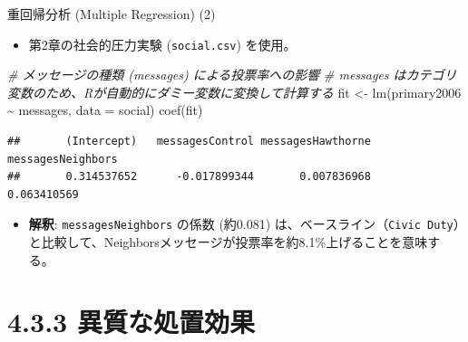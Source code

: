\documentclass[
  ignorenonframetext,
]{beamer}
\newenvironment{Shaded}{\begin{snugshade}}{\end{snugshade}}
\newcommand{\AttributeTok}[1]{\textcolor[rgb]{0.77,0.63,0.00}{#1}}
\newcommand{\CommentTok}[1]{\textcolor[rgb]{0.56,0.35,0.01}{\textit{#1}}}
\newcommand{\FunctionTok}[1]{\textcolor[rgb]{0.00,0.00,0.00}{#1}}
\newcommand{\NormalTok}[1]{#1}
\newcommand{\OtherTok}[1]{\textcolor[rgb]{0.56,0.35,0.01}{#1}}
\newcommand{\SpecialCharTok}[1]{\textcolor[rgb]{0.00,0.00,0.00}{#1}}
\providecommand{\tightlist}{%
  \setlength{\itemsep}{0pt}\setlength{\parskip}{0pt}}
\begin{document}
\begin{frame}[fragile]{重回帰分析 (Multiple Regression) (2)}
\protect\hypertarget{ux91cdux56deux5e30ux5206ux6790-multiple-regression-2}{}
\begin{itemize}
\tightlist
\item
  第2章の社会的圧力実験 (\texttt{social.csv}) を使用。
\end{itemize}

\scriptsize

\begin{Shaded}
\begin{Highlighting}[]
\CommentTok{\# メッセージの種類 (messages) による投票率への影響}
\CommentTok{\# messages はカテゴリ変数のため、Rが自動的にダミー変数に変換して計算する}
\NormalTok{fit }\OtherTok{\textless{}{-}} \FunctionTok{lm}\NormalTok{(primary2006 }\SpecialCharTok{\textasciitilde{}}\NormalTok{ messages, }\AttributeTok{data =}\NormalTok{ social)}
\FunctionTok{coef}\NormalTok{(fit)}
\end{Highlighting}
\end{Shaded}

\begin{verbatim}
##       (Intercept)   messagesControl messagesHawthorne messagesNeighbors 
##       0.314537652      -0.017899344       0.007836968       0.063410569
\end{verbatim}

\normalsize

\begin{itemize}
\tightlist
\item
  \textbf{解釈}: \texttt{messagesNeighbors} の係数 (約0.081)
  は、ベースライン（\texttt{Civic\ Duty}）と比較して、Neighborsメッセージが投票率を約8.1\%上げることを意味する。
\end{itemize}
\end{frame}

\hypertarget{ux7570ux8ceaux306aux51e6ux7f6eux52b9ux679c}{%
\section{4.3.3
異質な処置効果}\label{ux7570ux8ceaux306aux51e6ux7f6eux52b9ux679c}}
\end{document}
